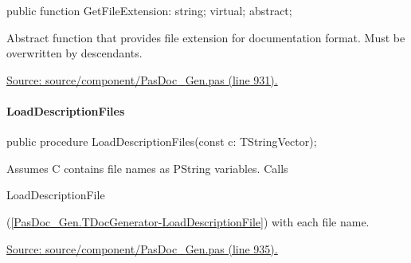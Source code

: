 \documentclass{report}
\newif\ifpdf
\begin{document}
\label{PasDoc_Gen.TDocGenerator-GetFileExtension}
\begin{list}{}{
\setlength{\itemindent}{0cm}
\setlength{\listparindent}{0cm}
\setlength{\leftmargin}{\evensidemargin}
\addtolength{\leftmargin}{\tmplength}
\settowidth{\labelsep}{X}
\addtolength{\leftmargin}{\labelsep}
\setlength{\labelwidth}{\tmplength}
}
\item[\textbf{Declaration}\hfill]
\ifpdf
\begin{flushleft}
\fi
\begin{ttfamily}
public function GetFileExtension: string; virtual; abstract;\end{ttfamily}

\ifpdf
\end{flushleft}
\fi

\par
\item[\textbf{Description}]
Abstract function that provides file extension for documentation format. Must be overwritten by descendants.\par
\href{https://github.com/pasdoc/pasdoc/blob/master/source/component/PasDoc_Gen.pas#L931}{Source: source/component/PasDoc{\_}Gen.pas (line 931).}

\end{list}
\paragraph*{LoadDescriptionFiles}\hspace*{\fill}

\label{PasDoc_Gen.TDocGenerator-LoadDescriptionFiles}
\begin{list}{}{
\setlength{\itemindent}{0cm}
\setlength{\listparindent}{0cm}
\setlength{\leftmargin}{\evensidemargin}
\addtolength{\leftmargin}{\tmplength}
\settowidth{\labelsep}{X}
\addtolength{\leftmargin}{\labelsep}
\setlength{\labelwidth}{\tmplength}
}
\item[\textbf{Declaration}\hfill]
\ifpdf
\begin{flushleft}
\fi
\begin{ttfamily}
public procedure LoadDescriptionFiles(const c: TStringVector);\end{ttfamily}

\ifpdf
\end{flushleft}
\fi

\par
\item[\textbf{Description}]
Assumes C contains file names as PString variables. Calls \begin{ttfamily}LoadDescriptionFile\end{ttfamily}(\ref{PasDoc_Gen.TDocGenerator-LoadDescriptionFile}) with each file name.\par
\href{https://github.com/pasdoc/pasdoc/blob/master/source/component/PasDoc_Gen.pas#L935}{Source: source/component/PasDoc{\_}Gen.pas (line 935).}

\end{list}
\end{document}
